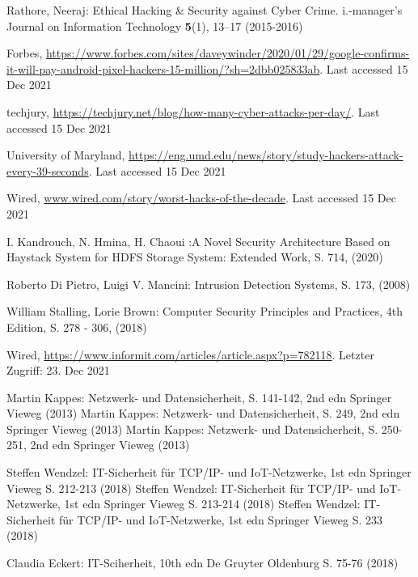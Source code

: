 \begin{thebibliography}{8}
Rathore, Neeraj: Ethical Hacking \& Security against Cyber Crime. i.-manager's Journal on Information Technology \textbf{5}(1), 13--17 (2015-2016)

Forbes, \url{https://www.forbes.com/sites/daveywinder/2020/01/29/google-confirms-it-will-pay-android-pixel-hackers-15-million/?sh=2dbb025833ab}. Last accessed 15 Dec 2021

techjury, \url{https://techjury.net/blog/how-many-cyber-attacks-per-day/}. Last accessed 15 Dec 2021

University of Maryland, \url{https://eng.umd.edu/news/story/study-hackers-attack-every-39-seconds}. Last accessed 15 Dec 2021

Wired, \url{www.wired.com/story/worst-hacks-of-the-decade}. Last accessed 15 Dec 2021

I. Kandrouch, N. Hmina, H. Chaoui
:A Novel Security Architecture Based on 
Haystack System for HDFS Storage System: 
Extended Work, S. 714, (2020)

Roberto Di Pietro, Luigi V. Mancini: Intrusion Detection Systems, S. 173, (2008)

William Stalling, Lorie Brown: Computer Security Principles and Practices, 4th Edition, S. 278 - 306, (2018) 

Wired, \url{https://www.informit.com/articles/article.aspx?p=782118}. Letzter Zugriff: 23. Dec 2021

Martin Kappes: Netzwerk- und Datensicherheit, S. 141-142, 2nd edn Springer Vieweg (2013)
Martin Kappes: Netzwerk- und Datensicherheit, S. 249, 2nd edn Springer Vieweg (2013)
Martin Kappes: Netzwerk- und Datensicherheit, S. 250-251, 2nd edn Springer Vieweg (2013)

Steffen Wendzel: IT-Sicherheit für TCP/IP- und IoT-Netzwerke, 1st edn Springer Vieweg S. 212-213 (2018)
Steffen Wendzel: IT-Sicherheit für TCP/IP- und IoT-Netzwerke, 1st edn Springer Vieweg S. 213-214 (2018)
Steffen Wendzel: IT-Sicherheit für TCP/IP- und IoT-Netzwerke, 1st edn Springer Vieweg S. 233 (2018)

Claudia Eckert: IT-Sciherheit, 10th edn De Gruyter Oldenburg S. 75-76 (2018)


\end{thebibliography}
